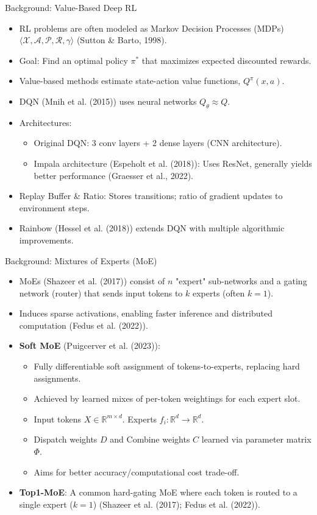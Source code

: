 \documentclass{beamer}
\newcommand{\puigcerverSoftMoE}{Puigcerver et al. (2023)}
\newcommand{\shazeerMoE}{Shazeer et al. (2017)}
\newcommand{\mnihDQN}{Mnih et al. (2015)}
\newcommand{\hesselRainbow}{Hessel et al. (2018)}
\newcommand{\espeholtImpala}{Espeholt et al. (2018)}
\newcommand{\fedusSwitch}{Fedus et al. (2022)}
\begin{document}
\begin{frame}{Background: Value-Based Deep RL}
  \begin{itemize}
    \item RL problems are often modeled as Markov Decision Processes (MDPs) $\langle\mathcal{X},\mathcal{A},\mathcal{P},\mathcal{R},\gamma\rangle$ (Sutton \& Barto, 1998).
    \item Goal: Find an optimal policy $\pi^*$ that maximizes expected discounted rewards.
    \item Value-based methods estimate state-action value functions, $Q^\pi(x,a)$.
    \item DQN (\mnihDQN{}) uses neural networks $Q_\theta \approx Q$.
    \item Architectures:
        \begin{itemize}
            \item Original DQN: 3 conv layers + 2 dense layers (CNN architecture).
            \item Impala architecture (\espeholtImpala{}): Uses ResNet, generally yields better performance (Graesser et al., 2022).
        \end{itemize}
    \item Replay Buffer \& Ratio: Stores transitions; ratio of gradient updates to environment steps.
    \item Rainbow (\hesselRainbow{}) extends DQN with multiple algorithmic improvements.
  \end{itemize}
\end{frame}

\begin{frame}{Background: Mixtures of Experts (MoE)}
  \begin{itemize}
    \item MoEs (\shazeerMoE{}) consist of $n$ "expert" sub-networks and a gating network (router) that sends input tokens to $k$ experts (often $k=1$).
    \item Induces sparse activations, enabling faster inference and distributed computation (\fedusSwitch{}).
    \item \textbf{Soft MoE} (\puigcerverSoftMoE{}):
    \begin{itemize}
        \item Fully differentiable soft assignment of tokens-to-experts, replacing hard assignments.
        \item Achieved by learned mixes of per-token weightings for each expert slot.
        \item Input tokens $X \in \mathbb{R}^{m \times d}$. Experts $f_i: \mathbb{R}^d \rightarrow \mathbb{R}^d$.
        \item Dispatch weights $D$ and Combine weights $C$ learned via parameter matrix $\Phi$.
        \item Aims for better accuracy/computational cost trade-off.
    \end{itemize}
    \item \textbf{Top1-MoE}: A common hard-gating MoE where each token is routed to a single expert ($k=1$) (\shazeerMoE{}; \fedusSwitch{}).
  \end{itemize}
\end{frame}
\end{document}
